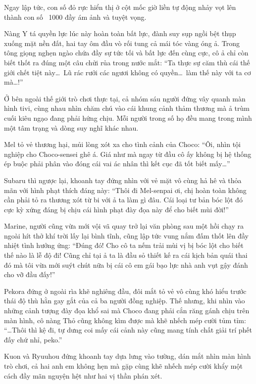 \documentclass[../main.tex]{subfiles}
\begin{document}
Ngay lập tức, con số {} đỏ rực hiển thị ở cột mốc giờ liền tự động nhảy vọt lên thành con số {\digi \ 1000} đầy ám ảnh và tuyệt vọng.

Nàng Y tá quyền lực lúc này hoàn toàn bất lực, đành suy sụp ngồi bệt thụp xuống mặt nền đất, hai tay ôm đầu vò rối tung cả mái tóc vàng óng ả. Trong tông giọng nghẹn ngào chứa đầy sự tức tối và bất lực đến cùng cực, cô ả chỉ còn biết thốt ra đúng một câu chửi rủa trong nước mắt: ``Ta thực sự căm thù cái thế giới chết tiệt này\dots\ Lũ rác rưởi các ngươi không có quyền\dots\ làm thế này với ta cơ mà\dots!''

Ở bên ngoài thế giới trò chơi thực tại, cả nhóm sáu người đứng vây quanh màn hình tivi, cùng nhau nhìn chăm chú vào cái khung cảnh thảm thương mà ả trùm cuối kiêu ngạo đang phải hứng chịu. Mỗi người trong số họ đều mang trong mình một tâm trạng và dòng suy nghĩ khác nhau.

Mel tỏ vẻ thương hại, mủi lòng xót xa cho tình cảnh của Choco: ``Ôi, nhìn tội nghiệp cho Choco-sensei ghê á. Giá như mà ngay từ đầu cô ấy không bị hệ thống ép buộc phải phân vào đóng cái vai ác nhân thì kết cục đã tốt biết mấy\dots''

Subaru thì ngược lại, khoanh tay đứng nhìn với vẻ mặt vô cùng hả hê và thỏa mãn với hình phạt thích đáng này: ``Thôi đi Mel-senpai ơi, chị hoàn toàn không cần phải tỏ ra thương xót từ bi với ả ta làm gì đâu. Cái loại tư bản bóc lột đó cực kỳ xứng đáng bị chịu cái hình phạt đày đọa này để cho biết mùi đời!''

Marine, người cũng vừa mới vội vã quay trở lại văn phòng sau một hồi chạy ra ngoài hít thở khí trời lấy lại bình tĩnh, cũng lập tức vung nắm đấm thốt lên đầy nhiệt tình hưởng ứng: ``Đúng đó! Cho cô ta nếm trải mùi vị bị bóc lột cho biết thế nào là lễ độ đi! Cũng chỉ tại ả ta là đầu sỏ thiết kế ra cái kịch bản quái thai đó mà tôi vừa mới suýt chút nữa bị cái cô em gái bạo lực nhà anh vụt gậy đánh cho vỡ đầu đấy!''

Pekora đứng ở ngoài rìa khẽ nghiêng đầu, đôi mắt tỏ vẻ vô cùng khó hiểu trước thái độ thù hằn gay gắt của cả ba người đồng nghiệp. Thế nhưng, khi nhìn vào những cảnh tượng đày đọa khổ sai mà Choco đang phải cắn răng gánh chịu trên màn hình, cô nàng Thỏ cũng không kìm được mà khẽ nhếch mép cười tủm tỉm: ``\dots Thôi thì kệ đi, tự dưng coi mấy cái cảnh này cũng mang tính chất giải trí phết đấy chứ nhỉ, peko.''

Kuon và Ryuuhou đứng khoanh tay dựa lưng vào tường, dán mắt nhìn màn hình trò chơi, cả hai anh em không hẹn mà gặp cùng khẽ nhếch mép cười khẩy một cách đầy mãn nguyện hệt như hai vị thần phán xét.
\end{document}
